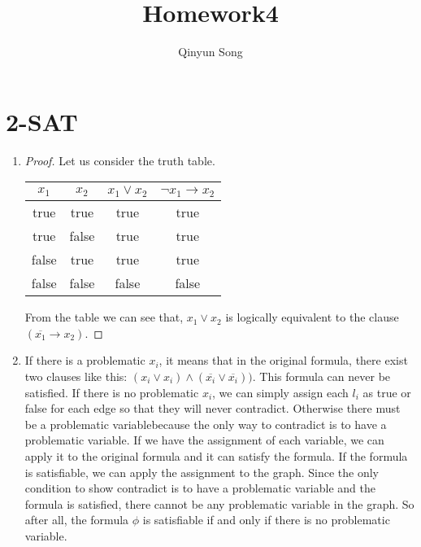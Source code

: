 \documentclass{article}
\title{Homework4}
\author{Qinyun Song}
\date{}
\begin{document}
	\maketitle

	\section{2-SAT}
		\begin{enumerate}
			\item \begin{proof}
				Let us consider the truth table.
				\newline
				\begin{tabular}{|c|c|c|c|}
					\hline
					$x_1$ & $x_2$ & $x_1 \vee x_2$ & $\neg{x_1} \to x_2$ \\
					\hline
					true & true & true & true \\
					\hline
					true & false & true & true \\
					\hline
					false & true & true & true \\
					\hline
					false & false & false & false \\
					\hline
				\end{tabular}
				\newline
				From the table we can see that, $x_1 \vee x_2$ is logically equivalent to the clause $(\overline{x_1} \to x_2)$.
			\end{proof}
			\item If there is a problematic $x_i$, it means that in the original formula, there exist two clauses like this: $(x_i \vee x_i)\wedge(\overline{x_i} \vee \overline{x_i}))$. This formula can never be satisfied. If there is no problematic $x_i$, we can simply assign each $l_i$ as true or false for each edge so that they will never contradict. Otherwise there must be a problematic variablebecause the only way to contradict is to have a problematic variable. If we have the assignment of each variable, we can apply it to the original formula and it can satisfy the formula. \newline
			If the formula is satisfiable, we can apply the assignment to the graph. Since the only condition to show contradict is to have a problematic variable and the formula is satisfied, there cannot be any problematic variable in the graph. So after all, the formula $\phi$ is satisfiable if and only if there is no problematic variable.
		\end{enumerate}
\end{document}
